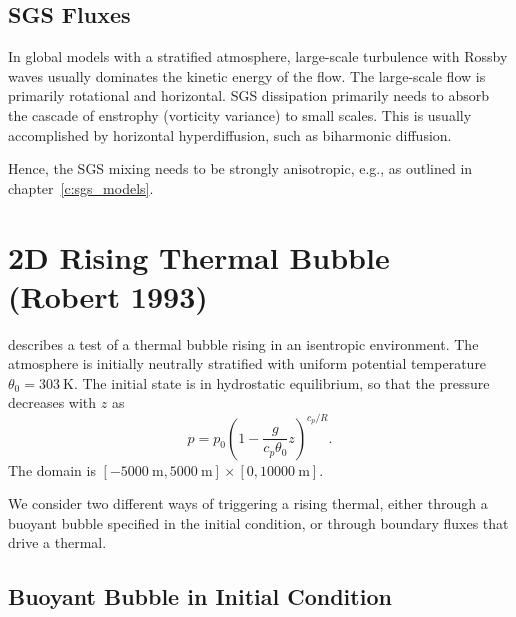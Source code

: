 \documentclass{report}
\begin{document}
\subsection{SGS Fluxes}

In global models with a stratified atmosphere, large-scale turbulence with Rossby waves usually dominates the kinetic energy of the flow. The large-scale flow is primarily rotational and horizontal. SGS dissipation primarily needs to absorb the cascade of enstrophy (vorticity variance) to small scales. This is usually accomplished by horizontal hyperdiffusion, such as biharmonic diffusion.

Hence, the SGS mixing needs to be strongly anisotropic, e.g., as outlined in chapter~\ref{c:sgs_models}.

\section{2D Rising Thermal Bubble (Robert 1993)}
\label{2dRTBtest}
\cite{robert1993} describes a test of a thermal bubble rising in an isentropic environment. The atmosphere is initially neutrally stratified with uniform potential temperature $\theta_0 = 303~\mathrm{K}$. The initial state is in hydrostatic equilibrium, so that the pressure decreases with $z$ as
\begin{equation}
\label{pressureDistrib}
p = p_{0}\left(1-\frac{g}{c_p{\theta_{0}}}z\right)^{c_p/R}.
\end{equation}
The domain is $[-5000~\mathrm{m},5000~\mathrm{m}]\times[0,10000~\mathrm{m}]$. 

We consider two different ways of triggering a rising thermal, either through a buoyant bubble specified in the initial condition, or through boundary fluxes that drive a thermal.

\subsection{Buoyant Bubble in Initial Condition}
\end{document}
